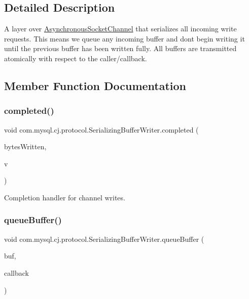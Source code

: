 \subsection{Detailed Description}
A layer over \mbox{\hyperlink{}{Asynchronous\+Socket\+Channel}} that serializes all incoming write requests. This means we queue any incoming buffer and don\textquotesingle{}t begin writing it until the previous buffer has been written fully. All buffers are transmitted atomically with respect to the caller/callback. 

\subsection{Member Function Documentation}
\mbox{\label{classcom_1_1mysql_1_1cj_1_1protocol_1_1_serializing_buffer_writer_a5cedb5f89370707b473b5e8619c7ccf1}} 
\subsubsection{\texorpdfstring{completed()}{completed()}}
{\footnotesize\ttfamily void com.\+mysql.\+cj.\+protocol.\+Serializing\+Buffer\+Writer.\+completed (\begin{DoxyParamCaption}\item[{Long}]{bytes\+Written,  }\item[{Void}]{v }\end{DoxyParamCaption})}

Completion handler for channel writes. \mbox{\label{classcom_1_1mysql_1_1cj_1_1protocol_1_1_serializing_buffer_writer_af340d231ae86b9546e151aae7515f4e3}} 
\subsubsection{\texorpdfstring{queue\+Buffer()}{queueBuffer()}}
{\footnotesize\ttfamily void com.\+mysql.\+cj.\+protocol.\+Serializing\+Buffer\+Writer.\+queue\+Buffer (\begin{DoxyParamCaption}\item[{Byte\+Buffer}]{buf,  }\item[{Completion\+Handler$<$ Long, Void $>$}]{callback }\end{DoxyParamCaption})}

